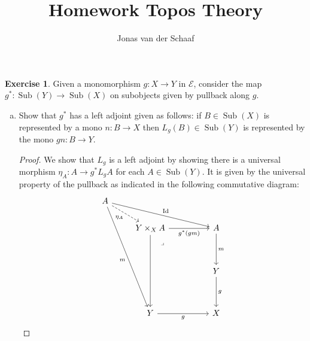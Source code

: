 \documentclass{article}
\title{Homework Topos Theory}
\author{Jonas van der Schaaf}
\date{}
\DeclareMathOperator{\Id}{Id}
\newcommand{\cattt}{\mathcal{E}}
\DeclareMathOperator{\subobj}{Sub}
\theoremstyle{definition}
\newtheorem{question}{Exercise}
\begin{document}
\maketitle

\begin{question}
    Given a monomorphism \(g:X\to Y\) in \(\cattt\), consider the map
    \(g^{*}:\subobj(Y)\to\subobj(X)\) on subobjects given by pullback along
    \(g\).

    \begin{enumerate}[a)]
        \item Show that \(g^{*}\) has a left adjoint given as follows:
              if \(B\in\subobj(X)\) is represented by a mono \(n:B\to X\) then
              \(L_{g}(B)\in\subobj(Y)\) is represented by the mono
              \(gn:B\to Y\).

              \begin{proof}
                  We show that \(L_{g}\) is a left adjoint by showing there is a
                  universal morphism \(\eta_{A}:A\to g^{*}L_{g}A\) for each
                  \(A\in\subobj(Y)\). It is given by the universal property of
                  the pullback as indicated in the following commutative
                  diagram:
                  \[
                      \begin{tikzcd}[ampersand replacement=\&]
                          A \\
                          \& {Y\times_{X}A} \&\& A \\
                          \\
                          \&\&\& Y \\
                          \\
                          \& Y \&\& X
                          \arrow["g", from=4-4, to=6-4]
                          \arrow["m", from=2-4, to=4-4]
                          \arrow["{g^{*}(gm)}"', from=2-2, to=2-4]
                          \arrow["g"', from=6-2, to=6-4]
                          \arrow[from=2-2, to=6-2]
                          \arrow["\lrcorner"{anchor=center, pos=0.125}, draw=none, from=2-2, to=6-4]
                          \arrow["\Id", from=1-1, to=2-4]
                          \arrow["m"', from=1-1, to=6-2]
                          \arrow["{\eta_{A}}"', dashed, from=1-1, to=2-2]
                      \end{tikzcd}
                  \]


\end{proof}
\end{enumerate}
\end{question}
\end{document}
